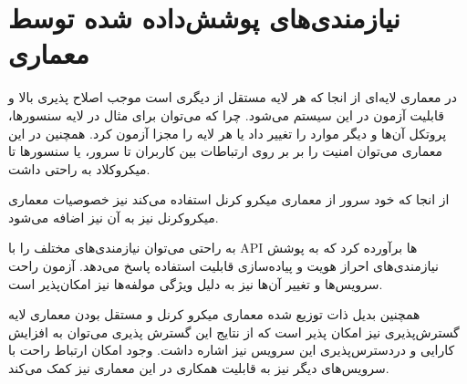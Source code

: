 \section{نیازمندی‌های پوشش‌داده شده توسط معماری}

در معماری لایه‌ای از انجا که هر لایه مستقل از دیگری است موجب اصلاح ‌پذیری بالا و قابلیت آزمون در این سیستم می‌شود. چرا که می‌توان برای مثال  در لایه سنسور‌ها، پروتکل آن‌ها و دیگر موارد را تغییر داد یا هر لایه را مجزا آزمون کرد.
همچنین در این معماری می‌توان امنیت را بر بر روی ارتباطات بین کاربران تا سرور، یا سنسورها تا میکروکلاد به راحتی داشت. 

از انجا که خود سرور از معماری میکرو کرنل استفاده می‌کند نیز خصوصیات معماری میکروکرنل نیز به آن نیز اضافه می‌شود. 

به راحتی می‌توان نیازمندی‌های مختلف را با API ها برآورده کرد که به پوشش نیازمندی‌های احراز هویت و پیاده‌سازی قابلیت استفاده پاسخ می‌دهد. آزمون راحت سرویس‌ها و تغییر آن‌ها نیز به دلیل ویژگی‌  
مولفه‌ها نیز امکان‌پذیر است. 

همچنین بدیل ذات توزیع شده معماری میکرو کرنل و مستقل بودن معماری لایه گسترش‌پذیری نیز امکان پذیر است که از نتایج این گسترش پذیری می‌توان به افزایش کارایی و دردسترس‌پذیری این سرویس نیز اشاره داشت.
وجود امکان ارتباط راحت با سرویس‌های دیگر نیز به قابلیت همکاری در این معماری نیز کمک می‌کند.